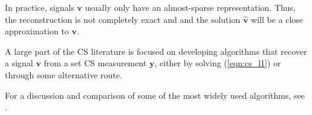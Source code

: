 In practice, signals $\bm v$ usually only have an almost-sparse representation.
Thus, the reconstruction is not completely exact and and the solution $\bm{\hat v}$ will be a close approximation to $\bm v$.

A large part of the CS literature is focused on developing algorithms that recover a signal $\bm v$ from a set CS measurement $\bm y$, either by solving (\ref{eqn:cs_l1}) or through some alternative route.

For a discussion and comparison of some of the most widely used algorithms, see \cite{pilikos2014}.
